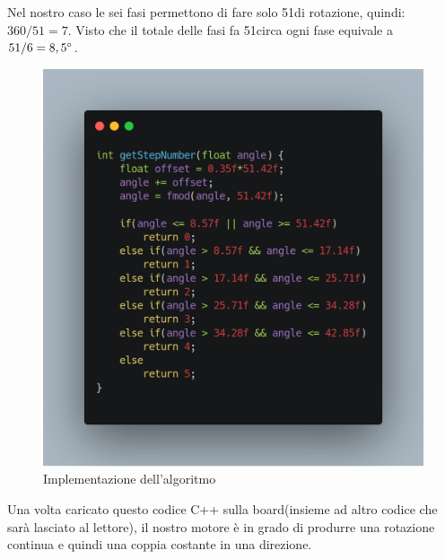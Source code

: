 \documentclass[a4paper]{report}
\begin{document}
    Nel nostro caso le sei fasi permettono di fare solo 51\degree {~}di rotazione, quindi: $360/51=7.$
    Visto che il totale delle fasi fa 51\degree circa ogni fase equivale a $51/6=8,5\degree$.
    
    \begin{figure}[htbp]
    \centering
    \includegraphics[scale=0.3,keepaspectratio=true]{step}
    \caption{Implementazione dell'algoritmo}    
    \end{figure}

Una volta caricato questo codice C++ sulla board(insieme ad altro codice che sarà lasciato al lettore), il nostro motore è in grado di produrre una rotazione continua e quindi una coppia costante in una direzione.



    
\end{document}

